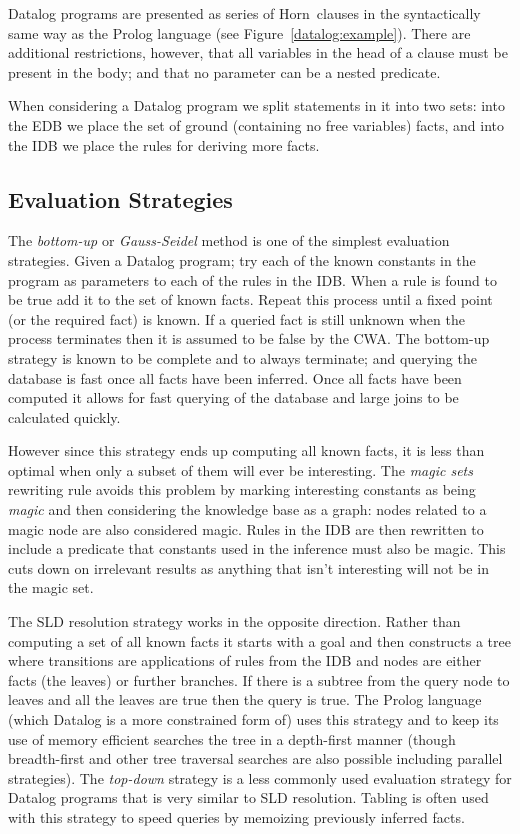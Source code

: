 \documentclass[a4paper,12pt,sfsidenotes]{tufte-book}
\begin{document}
Datalog programs are presented as series of Horn~clauses in the syntactically
same way as the Prolog language (see Figure~\ref{datalog:example}).  There are
additional restrictions, however, that all variables in the head of a clause
must be present in the body; and that no parameter can be a nested predicate.

When considering a Datalog program we split statements in it into two sets: into
the \ac{EDB} we place the set of ground (containing no free variables) facts,
and into the \ac{IDB} we place the rules for deriving more facts.

\subsection{Evaluation Strategies}

The \emph{bottom-up} or \emph{Gauss-Seidel} method is one of the simplest
evaluation strategies\cite{Ceri:1989ff}.  Given a Datalog program; try each of
the known constants in the program as parameters to each of the rules in the
\ac{IDB}.  When a rule is found to be true add it to the set of known facts.
Repeat this process until a fixed point (or the required fact) is known.  If a
queried fact is still unknown when the process terminates then it is assumed to
be false by the \ac{CWA}.  The bottom-up strategy is known to be
complete and to always terminate; and querying the database is fast once all
facts have been inferred.  Once all facts have been computed it allows for fast
querying of the database and large joins to be calculated quickly.

However since this strategy ends up computing all known facts, it is less than
optimal when only a subset of them will ever be interesting.  The \emph{magic
sets}\cite{Bancilhon:1985cz} rewriting rule avoids this problem by marking
interesting constants as being \emph{magic} and then considering the knowledge
base as a graph: nodes related to a magic node are also considered magic.  Rules
in the \ac{IDB} are then rewritten to include a predicate that constants used in
the inference must also be magic.  This cuts down on irrelevant results as
anything that isn't interesting will not be in the magic set.

The \ac{SLD} resolution strategy works in the opposite direction.  Rather than
computing a set of all known facts it starts with a goal and then constructs a
tree where transitions are applications of rules from the \ac{IDB} and nodes are
either facts (the leaves) or further branches.  If there is a subtree from the
query node to leaves and all the leaves are true then the query is true.  The
Prolog language (which Datalog is a more constrained form of) uses this strategy
and to keep its use of memory efficient searches the tree in a depth-first
manner (though breadth-first and other tree traversal searches are also possible
including parallel strategies).  
The \emph{top-down} strategy is a less commonly used evaluation strategy for Datalog
programs that is very similar to \ac{SLD} resolution. Tabling is often used with
this strategy to speed queries by memoizing previously inferred facts.
\end{document}
